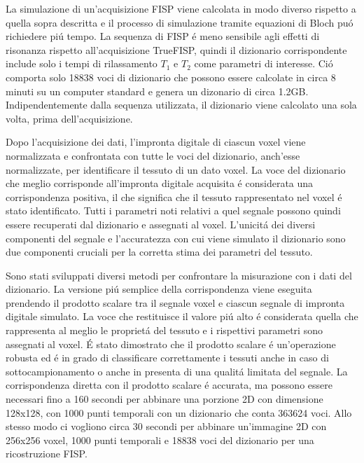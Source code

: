 \documentclass[a4paper,12pt]{report}
\begin{document}
 La simulazione di un'acquisizione FISP viene calcolata in modo diverso rispetto a quella sopra descritta e il processo di simulazione tramite equazioni di Bloch pu\'o richiedere pi\'u tempo. 
 La sequenza di FISP \'e meno sensibile agli effetti di risonanza rispetto all'acquisizione TrueFISP, quindi il dizionario corrispondente include solo i tempi di rilassamento $T_1$ e $T_2$ come parametri di interesse. 
 Ci\'o comporta solo 18838 voci di dizionario che possono essere calcolate in circa 8 minuti su un computer standard e genera un dizonario di circa 1.2GB. 
 Indipendentemente dalla sequenza utilizzata, il dizionario viene calcolato una sola volta, prima dell'acquisizione. 
 
 Dopo l'acquisizione dei dati, l'impronta digitale di ciascun voxel viene normalizzata e confrontata con tutte le voci del dizionario, anch'esse normalizzate, per identificare il tessuto di un dato voxel. 
 La voce del dizionario che meglio corrisponde all'impronta digitale acquisita \'e considerata una corrispondenza positiva, il che significa che il tessuto rappresentato nel voxel \'e stato identificato. 
 Tutti i parametri noti relativi a quel segnale possono quindi essere recuperati dal dizionario e assegnati al voxel. 
 L'unicit\'a dei diversi componenti del segnale e l'accuratezza con cui viene simulato il dizionario sono due componenti cruciali per la corretta stima dei parametri del tessuto. 
 
 Sono stati sviluppati diversi metodi per confrontare la misurazione con i dati del dizionario. 
 La versione pi\'u semplice della corrispondenza viene eseguita prendendo il prodotto scalare tra il segnale voxel e ciascun segnale di impronta digitale simulato. 
 La voce che restituisce il valore pi\'u alto \'e considerata quella che rappresenta al meglio le propriet\'a del tessuto e i rispettivi parametri sono assegnati al voxel. 
 \'E stato dimostrato che il prodotto scalare \'e un'operazione robusta ed \'e in grado di classificare correttamente i tessuti anche in caso di sottocampionamento o anche in presenta di una qualit\'a limitata del segnale. 
 La corrispondenza diretta con il prodotto scalare \'e accurata, ma possono essere necessari fino a 160 secondi per abbinare una porzione 2D con dimensione 128x128, con 1000 punti temporali con un  dizionario che conta 363624 voci. 
 Allo stesso modo ci vogliono circa 30 secondi per abbinare un'immagine 2D con 256x256 voxel, 1000 punti temporali e 18838 voci del dizionario per una ricostruzione FISP. 
 
\end{document}
